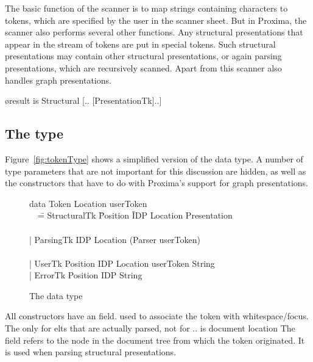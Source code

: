 \documentclass[12pt]{article}
\begin{document}
The basic function of the scanner is to map strings containing characters to tokens, which are specified by the user in the scanner sheet. But in Proxima, the scanner also performs several other functions. Any structural presentations that appear in the stream of tokens are put in special tokens. Such structural presentations may contain other structural presentations, or again parsing presentations, which are recursively scanned. Apart from this scanner also handles graph presentations. 


\bl
\o result is Structural [.. [PresentationTk]..]
\el

\subsection{The  type}

Figure~\ref{fig:tokenType} shows a simplified version of the  data type. A number of type parameters that are not important for this discussion are hidden, as well as the constructors that have to do with Proxima's support for graph presentations. 
\begin{figure}
\begin{center}
\begin{tabbedCode}
data Token Location userToken\\ 
~~\= =  StructuralTk \= Position \= IDP Location Presentation \\
  \>                \\
  \> | ParsingTk    \>          \> IDP Location (Parser userToken)\\
  \>                \\
  \> | UserTk       \> Position IDP Location userToken String \\
  \> | ErrorTk      \> Position IDP String \\
\end{tabbedCode}
\caption{The  data type} \label{xprezprim} 
\end{center}
\end{figure}

All constructors have an  field. used to associate the token with whitespace/focus. The  only for elts that are actually parsed, not for ..   is document location
The  field refers to the node in the document tree from which the token originated. It is used when parsing structural presentations.
\end{document}
